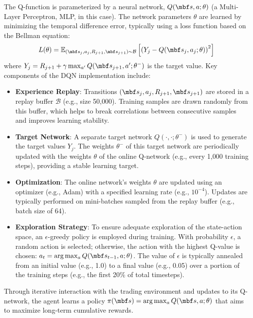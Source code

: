 \documentclass[12pt,a4paper]{article}
\begin{document}
The Q-function is parameterized by a neural network, $Q(\mbf s, a; \theta)$ (a Multi-Layer Perceptron, MLP, in this case). The network parameters $\theta$ are learned by minimizing the temporal difference error, typically using a loss function based on the Bellman equation:
%
\[
L(\theta) = \mathbb{E}_{(\mbf s_j, a_j, R_{j+1}, \mbf s_{j+1}) \sim \mathcal{B}} \left[ \left( Y_j - Q(\mbf s_j, a_j; \theta) \right)^2 \right]
\]
%
where $Y_j = R_{j+1} + \gamma \max_{a'} Q(\mbf s_{j+1}, a'; \theta^-)$ is the target value.
Key components of the DQN implementation include:
\begin{itemize}
    \item \textbf{Experience Replay}: Transitions $(\mbf s_j, a_j, R_{j+1}, \mbf s_{j+1})$ are stored in a replay buffer $\mathcal{B}$ (e.g., size 50,000). Training samples are drawn randomly from this buffer, which helps to break correlations between consecutive samples and improves learning stability.
    \item \textbf{Target Network}: A separate target network $Q(\cdot, \cdot; \theta^-)$ is used to generate the target values $Y_j$. The weights $\theta^-$ of this target network are periodically updated with the weights $\theta$ of the online Q-network (e.g., every 1,000 training steps), providing a stable learning target.
    \item \textbf{Optimization}: The online network's weights $\theta$ are updated using an optimizer (e.g., Adam) with a specified learning rate (e.g., $10^{-4}$). Updates are typically performed on mini-batches sampled from the replay buffer (e.g., batch size of 64).
    \item \textbf{Exploration Strategy}: To ensure adequate exploration of the state-action space, an $\epsilon$-greedy policy is employed during training. With probability $\epsilon$, a random action is selected; otherwise, the action with the highest Q-value is chosen: $a_t = \arg\max_a Q(\mbf s_{t-1}, a; \theta)$. The value of $\epsilon$ is typically annealed from an initial value (e.g., 1.0) to a final value (e.g., 0.05) over a portion of the training steps (e.g., the first 20\% of total timesteps).
\end{itemize}
Through iterative interaction with the trading environment and updates to its Q-network, the agent learns a policy $\pi(\mbf s) = \arg\max_a Q(\mbf s, a; \theta)$ that aims to maximize long-term cumulative rewards.


\Vhrulefill
\end{document}
